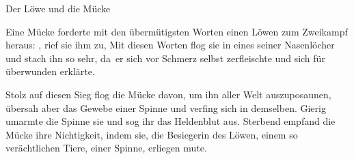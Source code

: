 
Der L\"owe und die M\"ucke

Eine M\"ucke forderte mit den \"uberm\"utigsten Worten
einen L\"owen zum Zweikampf heraus: , rief sie ihm
zu,  Mit diesen Worten flog sie in eines seiner
Nasenl\"ocher und stach ihn so sehr, da\SS\ er sich vor
Schmerz selbst zerfleischte und sich f\"ur \"uberwunden
erkl\"arte. 

Stolz auf diesen Sieg flog die M\"ucke davon, um ihn aller
Welt auszuposaunen, \"ubersah aber das Gewebe einer Spinne
und verfing sich in demselben. Gierig umarmte die Spinne
sie und sog ihr das Heldenblut aus. Sterbend empfand die
M\"ucke ihre Nichtigkeit, indem sie, die Besiegerin des
L\"owen, einem so ver\"achtlichen Tiere, einer Spinne,
erliegen mu\SS te. 

